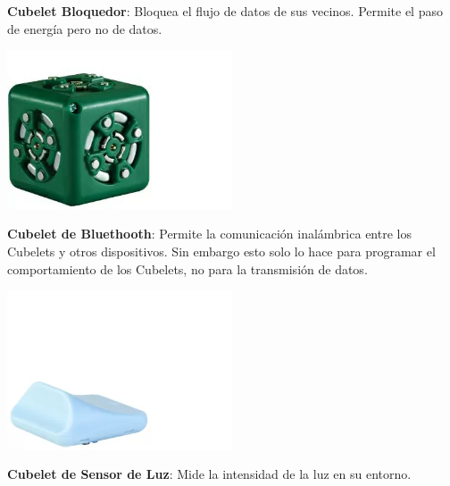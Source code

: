 \begin{itemize}
\begin{minipage}
        \end{minipage}
        \begin{minipage}
            {0.5\textwidth}
            \item \textbf{Cubelet Bloquedor}: Bloquea el flujo de datos de sus vecinos.
                Permite el paso de energ\'ia pero no de datos.
        \end{minipage}
        \begin{minipage}
            {0.5\textwidth}
            \centering
            \includegraphics[width=0.5\textwidth]{./images/marco_teorico/cubelets/bloqueador.png}
        \end{minipage}
        \begin{minipage}
            {0.5\textwidth}
            \item \textbf{Cubelet de Bluethooth}: Permite la comunicaci\'on inal\'ambrica entre
                los Cubelets y otros dispositivos. Sin embargo esto solo lo hace para programar el 
                comportamiento de los Cubelets, no para la transmisi\'on de datos.
        \end{minipage}
        \begin{minipage}
            {0.5\textwidth}
            \centering
            \includegraphics[width=0.5\textwidth]{./images/marco_teorico/cubelets/bluetooth.png}
        \end{minipage}
        \begin{minipage}
            {0.5\textwidth}
            \item \textbf{Cubelet de Sensor de Luz}: Mide la intensidad de la luz en su entorno.

\end{minipage}
\end{itemize}
